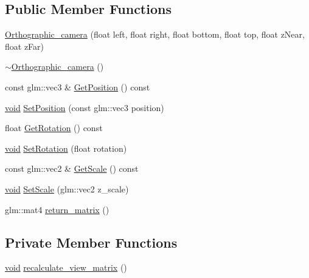 \subsection*{Public Member Functions}
\begin{DoxyCompactItemize}
\item 
\hyperlink{classOrthographic__camera_aeb45b5f12a351769d0b80a2926193e7f}{Orthographic\+\_\+camera} (float left, float right, float bottom, float top, float z\+Near, float z\+Far)
\item 
\hyperlink{classOrthographic__camera_abd3ea1d0674fc8de61786ff787d97390}{$\sim$\+Orthographic\+\_\+camera} ()
\item 
const glm\+::vec3 \& \hyperlink{classOrthographic__camera_aae41cb7e5c48eb6ce5354d86c9d13123}{Get\+Position} () const
\item 
\hyperlink{imgui__impl__opengl3__loader_8h_ac668e7cffd9e2e9cfee428b9b2f34fa7}{void} \hyperlink{classOrthographic__camera_a3cf573e0cc2b494bf6ca7adf11df8d0f}{Set\+Position} (const glm\+::vec3 position)
\item 
float \hyperlink{classOrthographic__camera_a8c9169569698fca75d45550b0cf450b3}{Get\+Rotation} () const
\item 
\hyperlink{imgui__impl__opengl3__loader_8h_ac668e7cffd9e2e9cfee428b9b2f34fa7}{void} \hyperlink{classOrthographic__camera_aafb33c86e3b3178dd76192e72306f1fb}{Set\+Rotation} (float rotation)
\item 
const glm\+::vec2 \& \hyperlink{classOrthographic__camera_a6e6a3c646d9f677e2522671b0c0f1ce0}{Get\+Scale} () const
\item 
\hyperlink{imgui__impl__opengl3__loader_8h_ac668e7cffd9e2e9cfee428b9b2f34fa7}{void} \hyperlink{classOrthographic__camera_ac3975aafe2fc108abf27a9df0068dd56}{Set\+Scale} (glm\+::vec2 z\+\_\+scale)
\item 
glm\+::mat4 \hyperlink{classOrthographic__camera_ac8140eaa2011ecc0a7fb80ca38111909}{return\+\_\+matrix} ()
\end{DoxyCompactItemize}
\subsection*{Private Member Functions}
\begin{DoxyCompactItemize}
\item 
\hyperlink{imgui__impl__opengl3__loader_8h_ac668e7cffd9e2e9cfee428b9b2f34fa7}{void} \hyperlink{classOrthographic__camera_aa878ce1cd32947da29852ea03dcffd01}{recalculate\+\_\+view\+\_\+matrix} ()
\end{DoxyCompactItemize}
